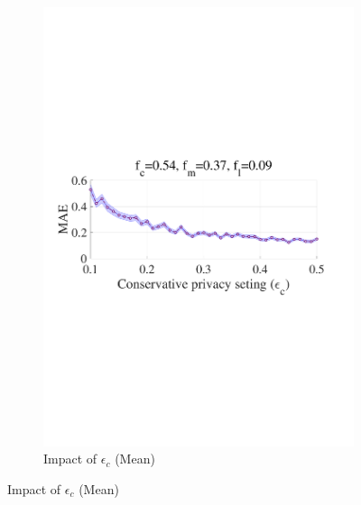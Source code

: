 \documentclass[letterpaper]{article} %
\begin{document}
\begin{figure}[htbp]
\begin{subfigure}[b]{0.23\textwidth}
    \includegraphics[width=\textwidth]{picture/MAEvsEps_average.pdf}
    \caption{Impact of $\epsilon_c$ (Mean)}
    \label{fig:maevsepsilon_c}
  \end{subfigure}

  \vspace{0.5cm} %


\end{figure}
\end{document}
